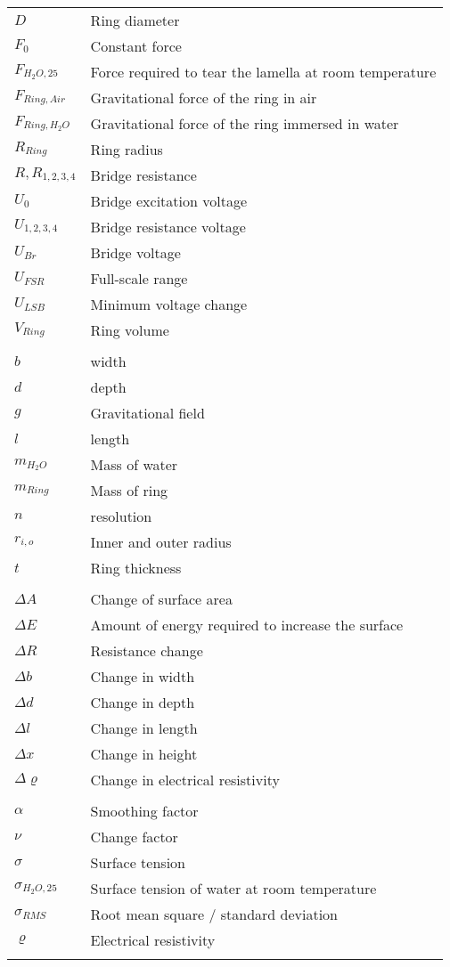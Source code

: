 %
\begin{longtable}[l]{@{}ll@{}}
	\( D \) & Ring diameter\\
	\( F_0 \) & Constant force\\
	\( F_{H_2O,25} \) & Force required to tear the lamella at room temperature\\
	\( F_{Ring,Air} \) & Gravitational force of the ring in air\\
	\( F_{Ring,H_2O} \) & Gravitational force of the ring immersed in water\\
	\( R_{Ring} \) & Ring radius\\
	\( R,R_{1,2,3,4} \) & Bridge resistance\\
	\( U_0 \) & Bridge excitation voltage\\
	\( U_{1,2,3,4} \) & Bridge resistance voltage\\
	\( U_{Br} \) & Bridge voltage\\
	\( U_{FSR} \) & Full-scale range\\
	\( U_{LSB} \) & Minimum voltage change\\
	\( V_{Ring} \) & Ring volume\\
	\\
	\( b \) & width\\
	\( d \) & depth\\
	\( g \) & Gravitational field\\
	\( l \) & length\\
	\( m_{H_2O} \) & Mass of water\\
	\( m_{Ring} \) & Mass of ring\\
	\( n \) & resolution\\
	\( r_{i,o} \) & Inner and outer radius\\
	\( t \) & Ring thickness\\
	\\
	\( \Delta A \) & Change of surface area\\
	\( \Delta E \) & Amount of energy required to increase the surface\\
	\( \Delta R \) & Resistance change\\
	\( \Delta b \) & Change in width\\
	\( \Delta d \) & Change in depth\\
	\( \Delta l \) & Change in length\\
	\( \Delta x \) & Change in height\\
	\( \Delta \varrho \) & Change in electrical resistivity\\
	\\
	\( \alpha \) & Smoothing factor\\
	\( \nu \) & Change factor\\
	\( \sigma \) & Surface tension\\
	\( \sigma_{H_2O,25} \) & Surface tension of water at room temperature\\
	\( \sigma_{RMS} \) & Root mean square / standard deviation\\
	\( \varrho \) & Electrical resistivity\\
	\label{tab:glossar}
\end{longtable}
